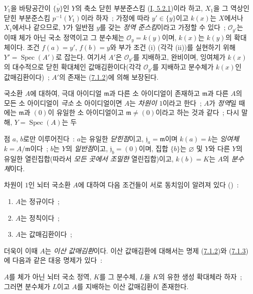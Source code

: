 $Y_1$을 바탕공간이 $\overline{\{y\}}$인 $Y$의 축소 닫힌 부분준스킴
(\hyperref[I.5.2.1-ko]{I, 5.2.1})이라 하고, $X_1$을 그 역상인 닫힌
부분준스킴 $p^{-1}(Y_1)$이라 하자~; 가정에 따라
$y'\in\overline{\{y\}}$이고 $k(x)$는 $X$에서나 $X_1$에서나 같으므로,
$Y$가 일반점 $y$를 갖는 \emph{정역 준스킴}이라고 가정할 수 있다~;
$\mathcal{O}_{y'}$는 이때 체가 아닌 국소 정역이고 그 분수체는
$\mathcal{O}_y=k(y)$이며, $k(x)$는 $k(y)$의 확대체이다. 조건
$f(a)=y'$, $f(b)=y$와 부가 조건 (i) (각각 (ii))를 실현하기 위해
$Y'=\operatorname{Spec}(A')$로 잡는다. 여기서 $A'$은
$\mathcal{O}_{y'}$를 지배하고, 완비이며, 잉여체가 $k(x)$의 대수적으로
닫힌 확대체인 값매김환이다(각각 $\mathcal{O}_{y'}$를 지배하고
분수체가 $k(x)$인 값매김환이다)~; $A'$의 존재는
(\hyperref[II.7.1.2-ko]{7.1.2})에 의해 보장된다.

\begin{env}[7.1.5]
\label{II.7.1.5-ko}
국소환 $A$에 대하여, 극대 아이디얼 $\mathfrak{m}$과 다른 소 아이디얼이
존재하고 $\mathfrak{m}$과 다른 $A$의 모든 소 아이디얼이
\emph{극소} 소 아이디얼이면 $A$는 \emph{차원이 $1$}이라고 한다~;
$A$가 \emph{정역}일 때에는 $\mathfrak{m}$과 $(0)$이 유일한 소 아이디얼이고
$\mathfrak{m}\neq(0)$이라고 하는 것과 같다~; 다시 말해,
$Y=\operatorname{Spec}(A)$는 두


점 $a$, $b$로만 이루어진다~: $a$는 유일한 \emph{닫힌점}이고,
$\mathfrak{j}_a=\mathfrak{m}$이며 $k(a)=k$는 \emph{잉여체}
$k=A/\mathfrak{m}$이다~; $b$는 $Y$의 \emph{일반점}이고,
$\mathfrak{j}_b=(0)$이며, 집합 $\{b\}$는 $\varnothing$ 및 $Y$와 다른
$Y$의 유일한 열린집합(따라서 \emph{모든 곳에서 조밀한} 열린집합)이고,
$k(b)=K$는 $A$의 \emph{분수체}이다.
\end{env}

\begin{env}[7.1.6]
\label{II.7.1.6-ko}
차원이 $1$인 뇌터 국소환 $A$에 대하여 다음 조건들이 서로 동치임이
알려져 있다
(\cite[p.~2-08 et 17-01]{I-1})~:
\begin{enumerate}
\item[\rm{a)}] $A$는 정규이다~;
\item[\rm{b)}] $A$는 정칙이다~;
\item[\rm{c)}] $A$는 값매김환이다~;
\end{enumerate}
더욱이 이때 $A$는 \emph{이산 값매김환}이다. 이산 값매김환에 대해서는
명제 (\hyperref[II.7.1.2-ko]{7.1.2})와
(\hyperref[II.7.1.3-ko]{7.1.3})에 다음과 같은 대응 명제가 있다~:
\end{env}

\begin{proposition}[7.1.7]
\label{II.7.1.7-ko}
$A$를 체가 아닌 뇌터 국소 정역, $K$를 그 분수체, $L$을 $K$의
유한 생성 확대체라 하자~; 그러면 분수체가 $L$이고 $A$를 지배하는
이산 값매김환이 존재한다.
\end{proposition}

